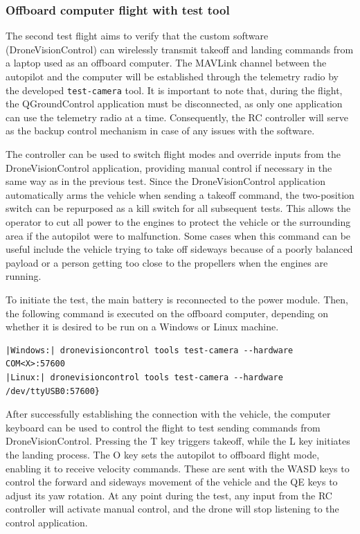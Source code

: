 \subsubsection{Offboard computer flight with test tool}
\label{subsec:fl-test-2}

The second test flight aims to verify that the custom software (DroneVisionControl) can wirelessly transmit takeoff and landing commands from a laptop used as an offboard computer. The MAVLink channel between the autopilot and the computer will be established through the telemetry radio by the developed \texttt{test-camera} tool. It is important to note that, during the flight, the QGroundControl application must be disconnected, as only one application can use the telemetry radio at a time. Consequently, the RC controller will serve as the backup control mechanism in case of any issues with the software. 

The controller can be used to switch flight modes and override inputs from the DroneVisionControl application, providing manual control if necessary in the same way as in the previous test. Since the DroneVisionControl application automatically arms the vehicle when sending a takeoff command, the two-position switch can be repurposed as a kill switch for all subsequent tests. This allows the operator to cut all power to the engines to protect the vehicle or the surrounding area if the autopilot were to malfunction. Some cases when this command can be useful include the vehicle trying to take off sideways because of a poorly balanced payload or a person getting too close to the propellers when the engines are running.

To initiate the test, the main battery is reconnected to the power module. Then, the following command is executed on the offboard computer, depending on whether it is desired to be run on a Windows or Linux machine.


\begin{verbatim}
|Windows:| dronevisioncontrol tools test-camera --hardware COM<X>:57600
|Linux:| dronevisioncontrol tools test-camera --hardware /dev/ttyUSB0:57600}
\end{verbatim}


After successfully establishing the connection with the vehicle, the computer keyboard can be used to control the flight to test sending commands from DroneVisionControl. Pressing the T key triggers takeoff, while the L key initiates the landing process. The O key sets the autopilot to offboard flight mode, enabling it to receive velocity commands. These are sent with the WASD keys to control the forward and sideways movement of the vehicle and the QE keys to adjust its yaw rotation. At any point during the test, any input from the RC controller will activate manual control, and the drone will stop listening to the control application.

